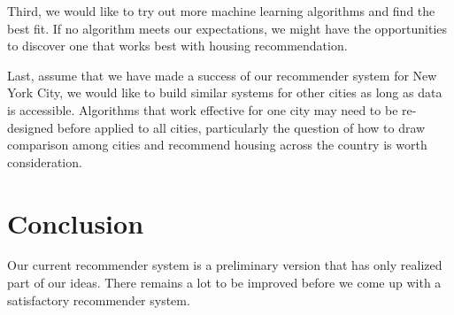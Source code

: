 \documentclass[letterpaper,twocolumn,10pt]{article}
\begin{document}
Third,  we would like to try out more machine learning algorithms and find the best fit. If no algorithm meets our expectations, we might have the opportunities to discover  one that works best with housing recommendation.

Last, assume that we have made a  success of our recommender system for New York City, we would like to build similar systems for other cities as long as data is accessible.   Algorithms that work effective for one city may need to be re-designed before applied to all cities, particularly the question of how to draw comparison among cities and recommend housing across the country  is worth consideration.  
 



\section{Conclusion}
Our current recommender system is a preliminary version that has only realized part of our ideas. There remains a lot to be improved before we come up with a satisfactory recommender system.

\end{document}
